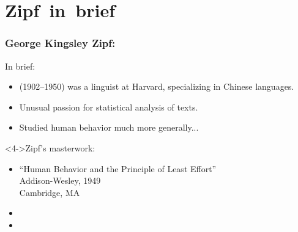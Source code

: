 \section{Zipf\ in\ brief}

\begin{frame}
  \frametitle{George Kingsley Zipf:}

  \begin{block}{In brief:}
    \begin{itemize}
    \item<1-> 
       (1902--1950) was a linguist at Harvard, specializing
      in Chinese languages.
    \item<2->
      Unusual passion for statistical analysis of texts.
    \item<3->
      Studied human behavior much more generally...
    \end{itemize}
  \end{block}

  \begin{block}<4->{Zipf's masterwork:}
    \begin{itemize}
    \item 
    ``Human Behavior and the Principle of Least Effort''\\
    Addison-Wesley, 1949\\
    Cambridge, MA\cite{zipf1949a}
    \end{itemize}
  \end{block}
  
  \begin{block}{}
  \begin{itemize}
  \item<5->  
  \item<6->  
  \end{itemize}
  \end{block}

\end{frame}

